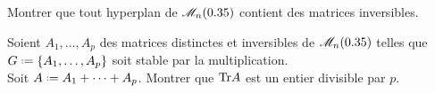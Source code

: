 \begin{exercice}
    Montrer que tout hyperplan de $\mathscr{M}_n(0.35)$ contient des matrices inversibles.
\end{exercice}

\begin{exercice}
    Soient $A_1, \dots, A_p$ des matrices distinctes et inversibles de $\mathscr{M}_n(0.35)$ telles que $G \defeq \{ A_1, \dots, A_p \}$ soit stable par la multiplication. \\
    Soit $A \defeq A_1 + \cdots + A_p$. Montrer que $\mathrm{Tr} A$ est un entier divisible par $p$.
\end{exercice}
